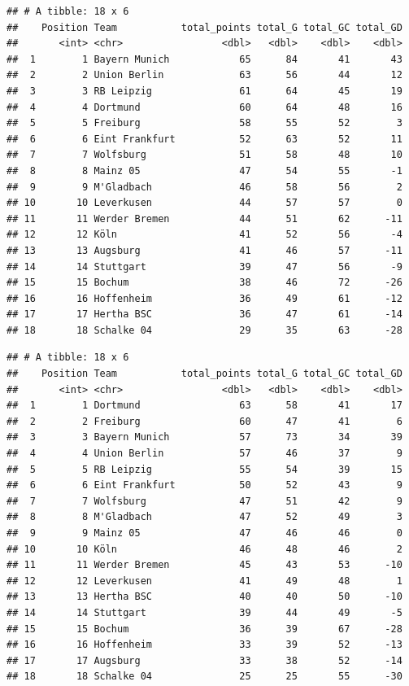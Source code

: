 \documentclass[
]{article}
\begin{document}
\begin{verbatim}
## # A tibble: 18 x 6
##    Position Team           total_points total_G total_GC total_GD
##       <int> <chr>                 <dbl>   <dbl>    <dbl>    <dbl>
##  1        1 Bayern Munich            65      84       41       43
##  2        2 Union Berlin             63      56       44       12
##  3        3 RB Leipzig               61      64       45       19
##  4        4 Dortmund                 60      64       48       16
##  5        5 Freiburg                 58      55       52        3
##  6        6 Eint Frankfurt           52      63       52       11
##  7        7 Wolfsburg                51      58       48       10
##  8        8 Mainz 05                 47      54       55       -1
##  9        9 M'Gladbach               46      58       56        2
## 10       10 Leverkusen               44      57       57        0
## 11       11 Werder Bremen            44      51       62      -11
## 12       12 Köln                     41      52       56       -4
## 13       13 Augsburg                 41      46       57      -11
## 14       14 Stuttgart                39      47       56       -9
## 15       15 Bochum                   38      46       72      -26
## 16       16 Hoffenheim               36      49       61      -12
## 17       17 Hertha BSC               36      47       61      -14
## 18       18 Schalke 04               29      35       63      -28
\end{verbatim}

\begin{verbatim}
## # A tibble: 18 x 6
##    Position Team           total_points total_G total_GC total_GD
##       <int> <chr>                 <dbl>   <dbl>    <dbl>    <dbl>
##  1        1 Dortmund                 63      58       41       17
##  2        2 Freiburg                 60      47       41        6
##  3        3 Bayern Munich            57      73       34       39
##  4        4 Union Berlin             57      46       37        9
##  5        5 RB Leipzig               55      54       39       15
##  6        6 Eint Frankfurt           50      52       43        9
##  7        7 Wolfsburg                47      51       42        9
##  8        8 M'Gladbach               47      52       49        3
##  9        9 Mainz 05                 47      46       46        0
## 10       10 Köln                     46      48       46        2
## 11       11 Werder Bremen            45      43       53      -10
## 12       12 Leverkusen               41      49       48        1
## 13       13 Hertha BSC               40      40       50      -10
## 14       14 Stuttgart                39      44       49       -5
## 15       15 Bochum                   36      39       67      -28
## 16       16 Hoffenheim               33      39       52      -13
## 17       17 Augsburg                 33      38       52      -14
## 18       18 Schalke 04               25      25       55      -30
\end{verbatim}
\end{document}
